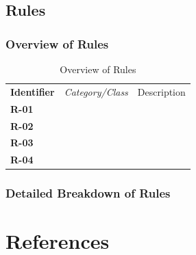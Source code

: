 \documentclass[12pt,letterpaper]{article}
\begin{document}
\subsection{Rules}
\subsubsection{Overview of Rules}

\begin{table}[H]
	\caption{Overview of Rules}
	\begin{tabu} to 
	    \tableheader{}Identifier & Category/Class & Description\\
		R-01 &  & \\
		R-02 &  & \\
		R-03 &  & \\
		R-04 &  & \\
	\end{tabu}
\end{table}

\subsubsection{Detailed Breakdown of Rules}

\renewcommand\refname{\vskip -1cm}
\section{References}
\end{document}
